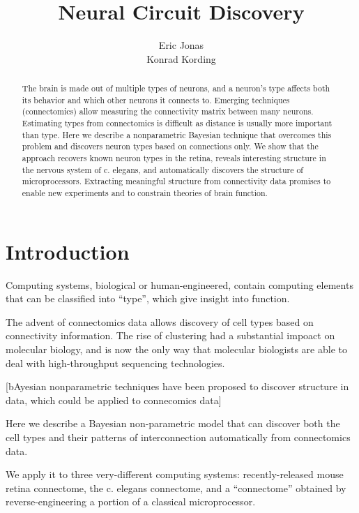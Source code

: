 \documentclass{article}
\title{Neural Circuit Discovery}
\author{Eric Jonas \\ Konrad Kording}
\begin{document}
\maketitle

\listoftodos

\begin{abstract}
  The brain is made out of multiple types of neurons, and a neuron’s
  type affects both its behavior and which other neurons it connects
  to. Emerging techniques (connectomics) allow measuring the
  connectivity matrix between many neurons. Estimating types from
  connectomics is difficult as distance is usually more important than
  type. Here we describe a nonparametric Bayesian technique that
  overcomes this problem and discovers neuron types based on
  connections only. We show that the approach recovers known neuron
  types in the retina, reveals interesting structure in the nervous
  system of c. elegans, and automatically discovers the structure of
  microprocessors. Extracting meaningful structure from connectivity
  data promises to enable new experiments and to constrain theories of
  brain function.

\end{abstract}

\section{Introduction}
Computing systems, biological or human-engineered, contain computing
elements that can be classified into ``type'', which give
insight into function. 

The advent of connectomics data allows discovery of cell types based
on connectivity information. The rise of clustering had a substantial
impoact on molecular biology, and is now the only way that molecular
biologists are able to deal with high-throughput sequencing
technologies.

[bAyesian nonparametric techniques have been proposed to 
discover structure in data, which could be applied to connecomics data]


Here we describe a Bayesian non-parametric model that can discover
both the cell types and their patterns of interconnection automatically
from connectomics data. 

We apply it to three very-different computing systems:
recently-released mouse retina connectome, the c. elegans connectome,
and a ``connectome'' obtained by reverse-engineering a portion of a
classical microprocessor.
\end{document}
